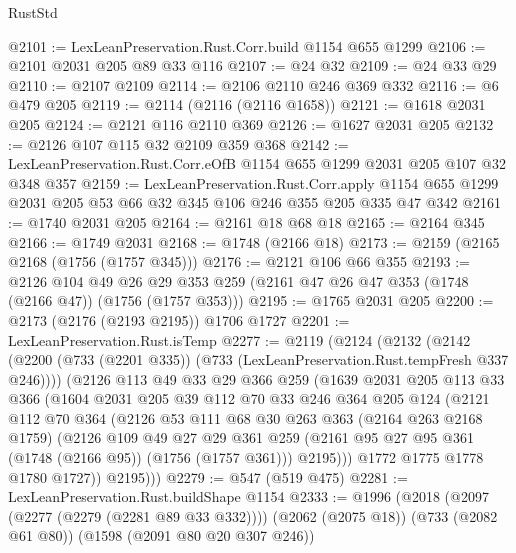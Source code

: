 \begin{lexlean}{RustStd}
\begin{coremodule}
@2101 := LexLeanPreservation.Rust.Corr.build @1154 @655 @1299
@2106 := @2101 @2031 @205 @89 @33 @116
@2107 := @24 @32
@2109 := @24 @33 @29
@2110 := @2107 @2109
@2114 := @2106 @2110 @246 @369 @332
@2116 := @6 @479 @205
@2119 := @2114 (@2116 (@2116 @1658))
@2121 := @1618 @2031 @205
@2124 := @2121 @116 @2110 @369
@2126 := @1627 @2031 @205
@2132 := @2126 @107 @115 @32 @2109 @359 @368
@2142 := LexLeanPreservation.Rust.Corr.eOfB @1154 @655 @1299 @2031 @205 @107 @32 @348 @357
@2159 := LexLeanPreservation.Rust.Corr.apply
    @1154
    @655
    @1299
    @2031
    @205
    @53
    @66
    @32
    @345
    @106
    @246
    @355
    @205
    @335
    @47
    @342
@2161 := @1740 @2031 @205
@2164 := @2161 @18 @68 @18
@2165 := @2164 @345
@2166 := @1749 @2031
@2168 := @1748 (@2166 @18)
@2173 := @2159 (@2165 @2168 (@1756 (@1757 @345)))
@2176 := @2121 @106 @66 @355
@2193 := @2126
    @104
    @49
    @26
    @29
    @353
    @259
    (@2161 @47 @26 @47 @353 (@1748 (@2166 @47)) (@1756 (@1757 @353)))
@2195 := @1765 @2031 @205
@2200 := @2173 (@2176 (@2193 @2195)) @1706 @1727
@2201 := LexLeanPreservation.Rust.isTemp
@2277 := @2119
    (@2124
      (@2132
        (@2142 (@2200 (@733 (@2201 @335)) (@733 (LexLeanPreservation.Rust.tempFresh @337 @246))))
        (@2126
          @113
          @49
          @33
          @29
          @366
          @259
          (@1639
            @2031
            @205
            @113
            @33
            @366
            (@1604
              @2031
              @205
              @39
              @112
              @70
              @33
              @246
              @364
              @205
              @124
              (@2121
                @112
                @70
                @364
                (@2126
                  @53
                  @111
                  @68
                  @30
                  @263
                  @363
                  (@2164 @263 @2168 @1759)
                  (@2126
                    @109
                    @49
                    @27
                    @29
                    @361
                    @259
                    (@2161 @95 @27 @95 @361 (@1748 (@2166 @95)) (@1756 (@1757 @361)))
                    @2195)))
              @1772
              @1775
              @1778
              @1780
              @1727))
          @2195)))
@2279 := @547 (@519 @475)
@2281 := LexLeanPreservation.Rust.buildShape @1154
@2333 := @1996
    (@2018
      (@2097 (@2277 (@2279 (@2281 @89 @33 @332))))
      (@2062 (@2075 @18))
      (@733 (@2082 @61 @80))
      (@1598 (@2091 @80 @20 @307 @246))

\end{coremodule}
\end{lexlean}
